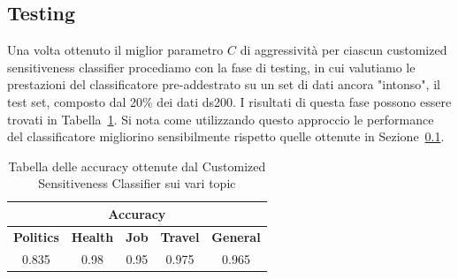 \subsection{Testing}
Una volta ottenuto il miglior parametro $C$ di aggressività per ciascun customized sensitiveness classifier procediamo con la fase di testing, in cui valutiamo le prestazioni del classificatore pre-addestrato su un set di dati ancora "intonso", il test set, composto dal 20\% dei dati ds200. I risultati di questa fase possono essere trovati in Tabella~\ref{tbl:testing_Customized}. Si nota come utilizzando questo approccio le performance del classificatore migliorino sensibilmente rispetto quelle ottenute in Sezione~\ref{}.


\begin{table}[h!t]
\centering
\label{tbl:testing_Customized}
\begin{tabular}{|c|c|c|c|c|}
\hline
\multicolumn{5}{|c|}{\textbf{Accuracy}} \\ \hline
\textbf{Politics} & \textbf{Health} & \textbf{Job} & \textbf{Travel} & \textbf{General} \\ \hline
0.835 & 0.98 & 0.95 & 0.975 & 0.965 \\ \hline
\end{tabular}
\caption{Tabella delle accuracy ottenute dal Customized Sensitiveness Classifier sui vari topic}
\end{table}
\FloatBarrier